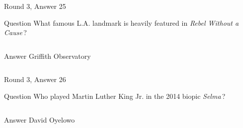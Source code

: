 \documentclass[11pt]{beamer}
\begin{document}
\begin{frame}[t]{Round 3, Answer 25}
  \vspace{2em}
  \begin{block}{Question}
    What famous L.A. landmark is heavily featured in \emph{Rebel Without a Cause}\,?
  \end{block}
  \pause{}
  \begin{columns}[T,totalwidth=\linewidth]
    \begin{column}{0.35\linewidth}
      \begin{block}{Answer}
        Griffith Observatory
      \end{block}
    \end{column}
    \begin{column}{0.6\linewidth}
      \begin{center}
        \texttt{[image: \{Images/griffith]}.jpg}
      \end{center}
    \end{column}
  \end{columns}
\end{frame}


\begin{frame}[t]{Round 3, Answer 26}
  \vspace{2em}
  \begin{block}{Question}
    Who played Martin Luther King Jr. in the 2014 biopic \emph{Selma}\,?
  \end{block}
  \pause{}
  \begin{columns}[T,totalwidth=\linewidth]
    \begin{column}{0.35\linewidth}
      \begin{block}{Answer}
        David Oyelowo
      \end{block}
    \end{column}
    \begin{column}{0.6\linewidth}
      \begin{center}
        \texttt{[image: \{Images/Selma-movie]}.jpg}
      \end{center}
    \end{column}
  \end{columns}
\end{frame}
\end{document}
